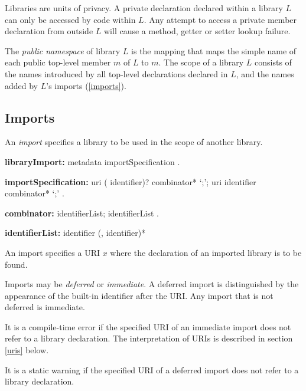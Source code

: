 \documentclass{article}
\begin{document}
\begin{itemize}
\LMHash{}
Libraries are units of privacy. A private declaration declared within a library $L$ can only be accessed by code within $L$. Any attempt to access a private member declaration from outside $L$ will cause a method, getter or setter lookup failure.


\LMHash{}
The {\em public namespace} of library $L$ is the mapping that maps the simple name of each public top-level member $m$ of $L$ to $m$.
The scope of a library $L$ consists of the names introduced by all top-level declarations declared in $L$, and the names added by $L$'s imports (\ref{imports}).


\subsection{Imports}

\LMHash{}
An {\em import} specifies a library to be used in the scope of another library.
\begin{grammar}
{\bf libraryImport:}
   metadata importSpecification
    .

 {\bf importSpecification:}
    \IMPORT{}  uri (\AS{} identifier)?  combinator* `{\escapegrammar ;}';
     \IMPORT{}  uri \DEFERRED{} \AS{} identifier  combinator* `{\escapegrammar ;}'
    .

{\bf combinator:}\SHOW{} identifierList;
\HIDE{} identifierList
    .

    {\bf identifierList:}
      identifier (, identifier)*
 \end{grammar}


\LMHash{}
An import specifies a URI $x$ where the declaration of an imported library is to be found.

\LMHash{}
Imports may be {\em deferred} or {\em immediate}. A deferred import is distinguished by the appearance of the built-in identifier \DEFERRED{} after the URI. Any import that is not deferred is immediate.

\LMHash{}
It is a compile-time error if  the specified URI of an immediate import does not refer to a library declaration.  The interpretation of URIs is described in section \ref{uris} below.

\LMHash{}
It is a static warning if the specified URI of a deferred import does not refer to a library declaration.




\end{itemize}
\end{document}
